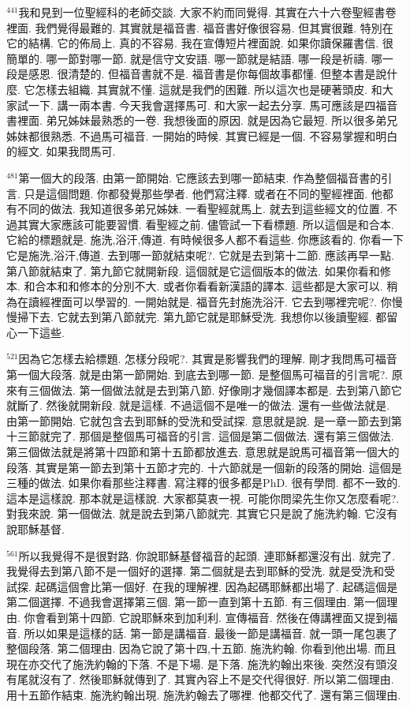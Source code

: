\documentclass{book}
\begin{document}
$^{441}$我和見到一位聖經科的老師交談.
大家不約而同覺得.
其實在六十六卷聖經書卷裡面.
我們覺得最難的.
其實就是福音書.
福音書好像很容易.
但其實很難.
特別在它的結構.
它的佈局上.
真的不容易.
我在宣傳短片裡面說.
如果你讀保羅書信.
很簡單的.
哪一節對哪一節.
就是信守文安語.
哪一節就是結語.
哪一段是祈禱.
哪一段是感恩.
很清楚的.
但福音書就不是.
福音書是你每個故事都懂.
但整本書是說什麼.
它怎樣去組織.
其實就不懂.
這就是我們的困難.
所以這次也是硬著頭皮.
和大家試一下.
講一兩本書.
今天我會選擇馬可.
和大家一起去分享.
馬可應該是四福音書裡面.
弟兄姊妹最熟悉的一卷.
我想後面的原因.
就是因為它最短.
所以很多弟兄姊妹都很熟悉.
不過馬可福音.
一開始的時候.
其實已經是一個.
不容易掌握和明白的經文.
如果我問馬可.

$^{481}$第一個大的段落.
由第一節開始.
它應該去到哪一節結束.
作為整個福音書的引言.
只是這個問題.
你都發覺那些學者.
他們寫注釋.
或者在不同的聖經裡面.
他都有不同的做法.
我知道很多弟兄姊妹.
一看聖經就馬上.
就去到這些經文的位置.
不過其實大家應該可能要習慣.
看聖經之前.
儘管試一下看標題.
所以這個是和合本.
它給的標題就是.
施洗,浴汗,傳道.
有時候很多人都不看這些.
你應該看的.
你看一下它是施洗,浴汗,傳道.
去到哪一節就結束呢?.
它就是去到第十二節.
應該再早一點.
第八節就結束了.
第九節它就開新段.
這個就是它這個版本的做法.
如果你看和修本.
和合本和和修本的分別不大.
或者你看看新漢語的譯本.
這些都是大家可以.
稍為在讀經裡面可以學習的.
一開始就是.
福音先封施洗浴汗.
它去到哪裡完呢?.
你慢慢掃下去.
它就去到第八節就完.
第九節它就是耶穌受洗.
我想你以後讀聖經.
都留心一下這些.

$^{521}$因為它怎樣去給標題.
怎樣分段呢?.
其實是影響我們的理解.
剛才我問馬可福音第一個大段落.
就是由第一節開始.
到底去到哪一節.
是整個馬可福音的引言呢?.
原來有三個做法.
第一個做法就是去到第八節.
好像剛才幾個譯本都是.
去到第八節它就斷了.
然後就開新段.
就是這樣.
不過這個不是唯一的做法.
還有一些做法就是.
由第一節開始.
它就包含去到耶穌的受洗和受試探.
意思就是說.
是一章一節去到第十三節就完了.
那個是整個馬可福音的引言.
這個是第二個做法.
還有第三個做法.
第三個做法就是將第十四節和第十五節都放進去.
意思就是說馬可福音第一個大的段落.
其實是第一節去到第十五節才完的.
十六節就是一個新的段落的開始.
這個是三種的做法.
如果你看那些注釋書.
寫注釋的很多都是PhD.
很有學問.
都不一致的.
這本是這樣說.
那本就是這樣說.
大家都莫衷一視.
可能你問梁先生你又怎麼看呢?.
對我來說.
第一個做法.
就是說去到第八節就完.
其實它只是說了施洗約翰.
它沒有說耶穌基督.

$^{561}$所以我覺得不是很對路.
你說耶穌基督福音的起頭.
連耶穌都還沒有出.
就完了.
我覺得去到第八節不是一個好的選擇.
第二個就是去到耶穌的受洗.
就是受洗和受試探.
起碼這個會比第一個好.
在我的理解裡.
因為起碼耶穌都出場了.
起碼這個是第二個選擇.
不過我會選擇第三個.
第一節一直到第十五節.
有三個理由.
第一個理由.
你會看到第十四節.
它說耶穌來到加利利.
宣傳福音.
然後在傳講裡面又提到福音.
所以如果是這樣的話.
第一節是講福音.
最後一節是講福音.
就一頭一尾包裹了整個段落.
第二個理由.
因為它說了第十四,十五節.
施洗約翰.
你看到他出場.
而且現在亦交代了施洗約翰的下落.
不是下場.
是下落.
施洗約翰出來後.
突然沒有頭沒有尾就沒有了.
然後耶穌就傳到了.
其實內容上不是交代得很好.
所以第二個理由.
用十五節作結束.
施洗約翰出現.
施洗約翰去了哪裡.
他都交代了.
還有第三個理由.
\end{document}
